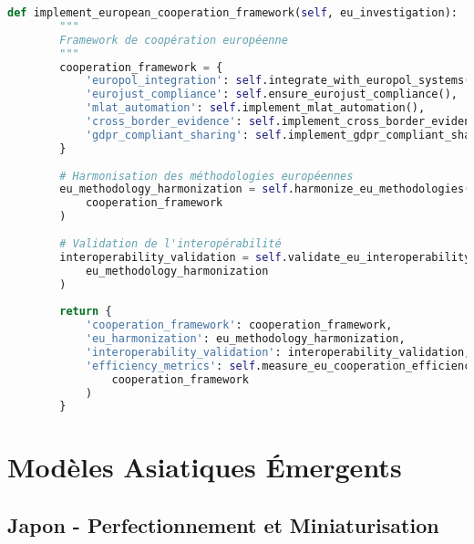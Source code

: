 \begin{lstlisting}[language=Python, caption=Framework français de souveraineté numérique]
    def implement_european_cooperation_framework(self, eu_investigation):
        """
        Framework de coopération européenne
        """
        cooperation_framework = {
            'europol_integration': self.integrate_with_europol_systems(),
            'eurojust_compliance': self.ensure_eurojust_compliance(),
            'mlat_automation': self.implement_mlat_automation(),
            'cross_border_evidence': self.implement_cross_border_evidence_sharing(),
            'gdpr_compliant_sharing': self.implement_gdpr_compliant_sharing()
        }
        
        # Harmonisation des méthodologies européennes
        eu_methodology_harmonization = self.harmonize_eu_methodologies(
            cooperation_framework
        )
        
        # Validation de l'interopérabilité
        interoperability_validation = self.validate_eu_interoperability(
            eu_methodology_harmonization
        )
        
        return {
            'cooperation_framework': cooperation_framework,
            'eu_harmonization': eu_methodology_harmonization,
            'interoperability_validation': interoperability_validation,
            'efficiency_metrics': self.measure_eu_cooperation_efficiency(
                cooperation_framework
            )
        }
\end{lstlisting}

\section{Modèles Asiatiques Émergents}

\subsection{Japon - Perfectionnement et Miniaturisation}

